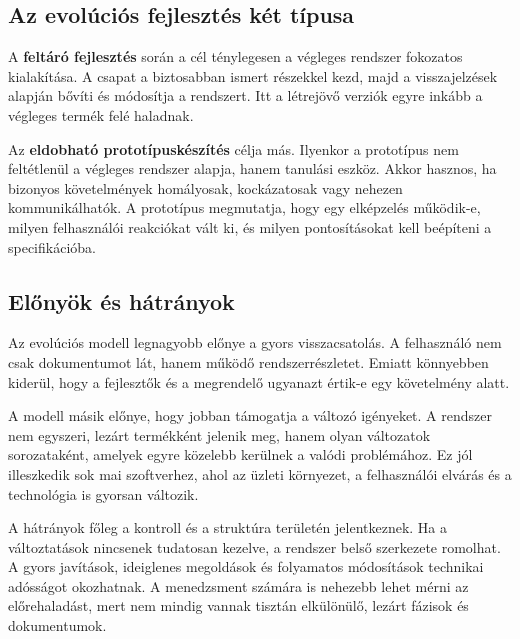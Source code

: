 \subsection{Az evolúciós fejlesztés két típusa}

\begin{center}

\end{center}

A \textbf{feltáró fejlesztés} során a cél ténylegesen a végleges rendszer fokozatos kialakítása. A csapat a biztosabban ismert részekkel kezd, majd a visszajelzések alapján bővíti és módosítja a rendszert. Itt a létrejövő verziók egyre inkább a végleges termék felé haladnak.

Az \textbf{eldobható prototípuskészítés} célja más. Ilyenkor a prototípus nem feltétlenül a végleges rendszer alapja, hanem tanulási eszköz. Akkor hasznos, ha bizonyos követelmények homályosak, kockázatosak vagy nehezen kommunikálhatók. A prototípus megmutatja, hogy egy elképzelés működik-e, milyen felhasználói reakciókat vált ki, és milyen pontosításokat kell beépíteni a specifikációba.

\subsection{Előnyök és hátrányok}

\begin{center}

\end{center}

Az evolúciós modell legnagyobb előnye a gyors visszacsatolás. A felhasználó nem csak dokumentumot lát, hanem működő rendszerrészletet. Emiatt könnyebben kiderül, hogy a fejlesztők és a megrendelő ugyanazt értik-e egy követelmény alatt.

A modell másik előnye, hogy jobban támogatja a változó igényeket. A rendszer nem egyszeri, lezárt termékként jelenik meg, hanem olyan változatok sorozataként, amelyek egyre közelebb kerülnek a valódi problémához. Ez jól illeszkedik sok mai szoftverhez, ahol az üzleti környezet, a felhasználói elvárás és a technológia is gyorsan változik.

A hátrányok főleg a kontroll és a struktúra területén jelentkeznek. Ha a változtatások nincsenek tudatosan kezelve, a rendszer belső szerkezete romolhat. A gyors javítások, ideiglenes megoldások és folyamatos módosítások technikai adósságot okozhatnak. A menedzsment számára is nehezebb lehet mérni az előrehaladást, mert nem mindig vannak tisztán elkülönülő, lezárt fázisok és dokumentumok.

